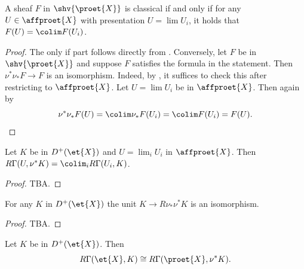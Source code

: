 \begin{corollary}
    A sheaf $F$ in $\shv{\proet{X}}$ is classical if and only if for any $U \in \affproet{X}$ with
    presentation $U = \lim U_i$, it holds that $F(U) = \colim F(U_i)$.
    \label{cor:classical-sheaf-iff-preserves}
\end{corollary}

\begin{proof}
    The only if part follows directly from . Conversely, let $F$ be
    in $\shv{\proet{X}}$ and suppose $F$ satisfies the formula in the statement. Then
    $\nu^* \nu_{*} F \to F$ is an isomorphism. Indeed, by , it suffices
    to check this after restricting to $\affproet{X}$. Let $U = \lim U_i$ be in $\affproet{X}$.
    Then again by 
    \[
        \nu^* \nu_{*} F (U) = \colim \nu_{*} F(U_i) = \colim F(U_i) = F(U) \qedhere
    .\]
\end{proof}

\begin{lemma}
    Let $K$ be in $D^+(\et{X})$ and $U = \lim_i U_i$ in $\affproet{X}$. Then
    $R \Gamma(U, \nu^*K) = \colim_i R\Gamma(U_i, K)$.
    \label{lemma:derived-pullback-section-affproet}
\end{lemma}

\begin{proof}
    TBA. 
\end{proof}

\begin{proposition}
    For any $K$ in $D^{+}(\et{X})$ the unit $K \to R \nu_{*} \nu^* K$ is an isomorphism.
    \label{prop:proetale-etale-iso}
\end{proposition}

\begin{proof}
    TBA. 
\end{proof}

\begin{corollary}
    Let $K$ be in $D^{+}(\et{X})$. Then
    \[
        R \Gamma(\et{X}, K) \cong R \Gamma(\proet{X}, \nu^{*} K)
    .\]
    \label{cor:derived-sections-proetale-etale-iso}
\end{corollary}

